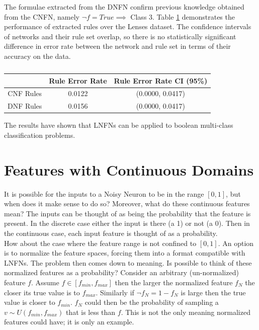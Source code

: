 The formulae extracted from the DNFN confirm previous knowledge obtained from the CNFN, namely $\lnot f = True \implies $ Class 3. Table \ref{tab:lenses-rule-peformance-comp} demonstrates the performance of extracted rules over the Lenses dataset. The confidence intervals of networks and their rule set overlap, so there is no statistically significant difference in error rate between the network and rule set in terms of their accuracy on the data.

\begin{table}[H]
	\begin{center}
		\begin{tabular}{| c | c | c |}
			\hline
			& Rule Error Rate & Rule Error Rate CI (95\%) \\
			\hline
			\hline
			CNF Rules & 0.0122 & (0.0000, 0.0417) \\
			\hline
			DNF Rules & 0.0156 & (0.0000, 0.0417) \\
			\hline
		\end{tabular}
	\end{center}
	\caption{}
	\label{tab:lenses-rule-peformance-comp}
\end{table}

The results have shown that LNFNs can be applied to boolean multi-class classification problems.

\section{Features with Continuous Domains}
It is possible for the inputs to a Noisy Neuron to be in the range $[0,1]$, but when does it make sense to do so? Moreover, what do these continuous features mean? The inputs can be thought of as being the probability that the feature is present. In the discrete case either the input is there (a 1) or not (a 0). Then in the continuous case, each input feature is thought of as a probability.\\

How about the case where the feature range is not confined to $[0,1]$. An option is to normalize the feature spaces, forcing them into a format compatible with LNFNs. The problem then comes down to meaning. Is possible to think of these normalized features as a probability? Consider an arbitrary (un-normalized) feature $f$. Assume $f \in [f_{min}, f_{max}]$ then the larger the normalized feature $f_N$ the closer its true value is to $f_{max}$. Similarly if $\lnot f_N = 1 - f_N$ is large then the true value is closer to $f_{min}$. $f_N$ could then be the probability of sampling a $v \sim U(f_{min}, f_{max})$ that is less than $f$. This is not the only meaning normalized features could have; it is only an example.\\

